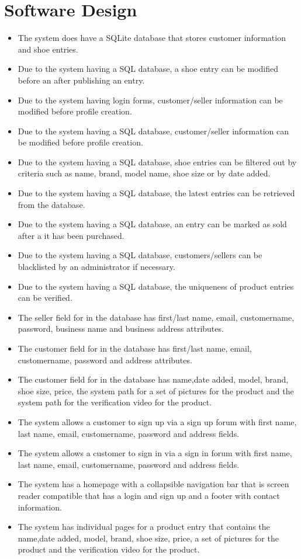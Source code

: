 \section{Software Design}
\begin{itemize}
  \item The system does have a SQLite database that stores customer information and shoe entries.
  \item Due to the system having a SQL database, a shoe entry can be modified before an after publishing an entry.
  \item Due to the system having login forms, customer/seller information can be modified before profile creation.
  \item Due to the system having a SQL database, customer/seller information can be modified before profile creation.
  \item Due to the system having a SQL database, shoe entries can be filtered out by criteria such as name, brand, model name, shoe size or by date added.
  \item Due to the system having a SQL database, the latest entries can be retrieved from the database.
  \item Due to the system having a SQL database, an entry can be marked as sold after a it has been purchased.
  \item Due to the system having a SQL database, customers/sellers can be blacklisted by an administrator if necessary.
  \item Due to the system having a SQL database, the uniqueness of product entries can be verified.
  \item The seller field for in the database has first/last name, email, customername, password, business name and business address attributes.
  \item The customer field for in the database has first/last name, email, customername, password and address attributes.
  \item The customer field for in the database has name,date added, model, brand, shoe size, price, the system path for a set of pictures for the product and the system path for the verification video for the product.
  \item The system allows a customer to sign up via a sign up forum with first name, last name, email, customername, password and address fields.
  \item The system allows a customer to sign in via a sign in forum with first name, last name, email, customername, password and address fields.
  \item The system has a homepage with a collapsible navigation bar that is screen reader compatible that has a login and sign up and a footer with contact information.
  \item The system has individual pages for a product entry that contains the name,date added, model, brand, shoe size, price, a set of pictures for the product and the verification video for the product.
\end{itemize}
